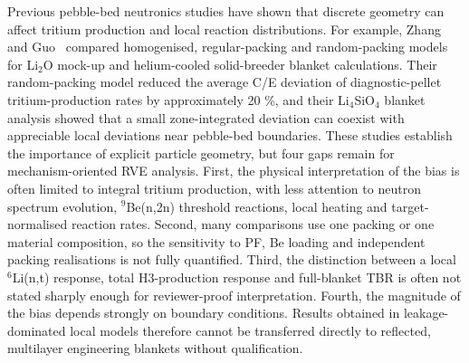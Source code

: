 \documentclass[preprint,12pt]{elsarticle}
\begin{document}
Previous pebble-bed neutronics studies have shown that discrete geometry can
affect tritium production and local reaction distributions.  For example, Zhang
and Guo~\cite{zhang2025} compared homogenised, regular-packing and
random-packing models for Li$_2$O mock-up and helium-cooled solid-breeder
blanket calculations.  Their random-packing model reduced the average C/E
deviation of diagnostic-pellet tritium-production rates by approximately
20 \%, and their Li$_4$SiO$_4$ blanket analysis showed that a small
zone-integrated deviation can coexist with appreciable local deviations near
pebble-bed boundaries.  These studies establish the importance of explicit
particle geometry, but four gaps remain for
mechanism-oriented RVE analysis.  First, the physical interpretation of the
bias is often limited to integral tritium production, with less attention to
neutron spectrum evolution, $^9$Be(n,2n) threshold reactions, local heating and
target-normalised reaction rates.  Second, many comparisons use one packing or
one material composition, so the sensitivity to PF, Be loading and independent
packing realisations is not fully quantified.  Third, the distinction between a
local $^6$Li(n,t) response, total H3-production response and full-blanket TBR is
often not stated sharply enough for reviewer-proof interpretation.  Fourth, the
magnitude of the bias depends strongly on boundary conditions.  Results
obtained in leakage-dominated local models therefore cannot be transferred
directly to reflected, multilayer engineering blankets without qualification.
\end{document}
